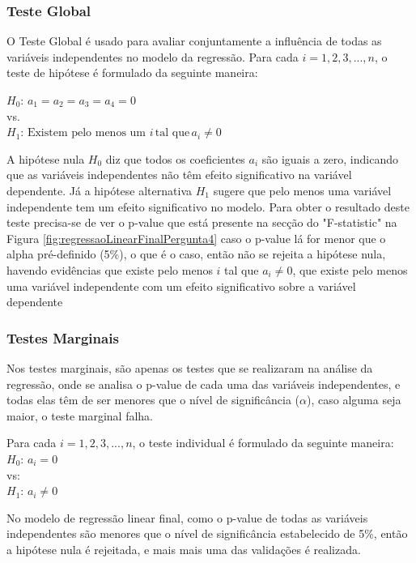 \documentclass[%
 aip,
cp,  %
 amsmath,amssymb,%
 reprint,%
]{revtex4-2}
\begin{document}
\subsubsection{Teste Global}
O Teste Global é usado para avaliar conjuntamente a influência de todas as variáveis independentes no modelo da regressão. Para cada \(i = 1, 2, 3, ..., n\), o teste de hipótese é formulado da seguinte maneira:
\hfill \break
\begin{center}
    \(H_0: \, a_1 = a_2 = a_3 = a_4 = 0\) \\
    vs.\\
    \(H_1: \, \text{Existem pelo menos um } i \, \text{tal que} \, a_i \neq 0\)
\end{center}
A hipótese nula \(H_0\) diz que todos os coeficientes \(a_i\) são iguais a zero, indicando que as variáveis independentes não têm efeito significativo na variável dependente. Já a hipótese alternativa \(H_1\) sugere que pelo menos uma variável independente tem um efeito significativo no modelo. Para obter o resultado deste teste precisa-se de ver o p-value que está presente na secção do "F-statistic" na Figura \ref{fig:regressaoLinearFinalPergunta4} caso o p-value lá for menor que o alpha pré-definido (5\%), o que é o caso, então não se rejeita a hipótese nula, havendo evidências que existe pelo menos $i$ tal que $a_{i}\ne0$, que existe pelo menos uma variável independente com um efeito significativo sobre a variável dependente

\subsubsection{Testes Marginais}
 Nos testes marginais, são apenas os testes que se realizaram na análise da regressão, onde se analisa o p-value de cada uma das variáveis independentes, e todas elas têm de ser menores que o nível de significância ($\alpha$), caso alguma seja maior, o teste marginal falha. \\
\begin{center}
    Para cada \(i = 1, 2, 3, ..., n\), o teste individual é formulado da seguinte maneira:
    \newline
    \(H_0: \, a_i = 0\) \\
    vs:\\
    \(H_1: \, a_i \neq 0\)
\end{center}
No modelo de regressão linear final, como o p-value de todas as variáveis independentes são menores que o nível de significância estabelecido de 5\%, então a hipótese nula é rejeitada, e mais mais uma das validações é realizada.
\end{document}

